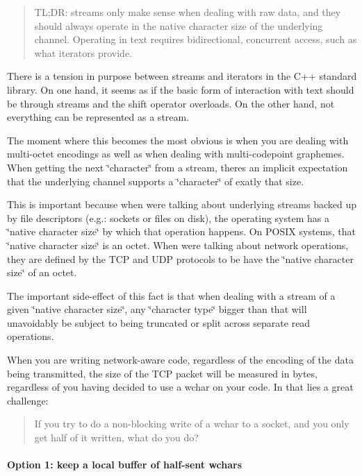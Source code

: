 \begin{quote}
TL;DR\+: streams only make sense when dealing with raw data, and they should always operate in the \textquotesingle{}native character size\textquotesingle{} of the underlying channel. Operating in text requires bidirectional, concurrent access, such as what iterators provide. \end{quote}


There is a tension in purpose between streams and iterators in the C++ standard library. On one hand, it seems as if the basic form of interaction with text should be through streams and the shift operator overloads. On the other hand, not everything can be represented as a stream.

The moment where this becomes the most obvious is when you are dealing with multi-\/octet encodings as well as when dealing with multi-\/codepoint graphemes. When getting the next \char`\"{}character\char`\"{} from a stream, there\textquotesingle{}s an implicit expectation that the underlying channel supports a \char`\"{}character\char`\"{} of exatly that size.

This is important because when we\textquotesingle{}re talking about underlying streams backed up by file descriptors (e.\+g.\+: sockets or files on disk), the operating system has a \char`\"{}native character size\char`\"{} by which that operation happens. On P\+O\+S\+IX systems, that \char`\"{}native character size\char`\"{} is an octet. When we\textquotesingle{}re talking about network operations, they are defined by the T\+CP and U\+DP protocols to be have the \char`\"{}native character size\char`\"{} of an octet.

The important side-\/effect of this fact is that when dealing with a stream of a given \char`\"{}native character size\char`\"{}, any \char`\"{}character type\char`\"{} bigger than that will unavoidably be subject to being truncated or split across separate read operations.

When you are writing network-\/aware code, regardless of the encoding of the data being transmitted, the size of the T\+CP packet will be measured in bytes, regardless of you having decided to use a wchar on your code. In that lies a great challenge\+:

\begin{quote}
If you try to do a non-\/blocking write of a wchar to a socket, and you only get half of it written, what do you do? \end{quote}


\paragraph*{Option 1\+: keep a local buffer of half-\/sent wchars}

